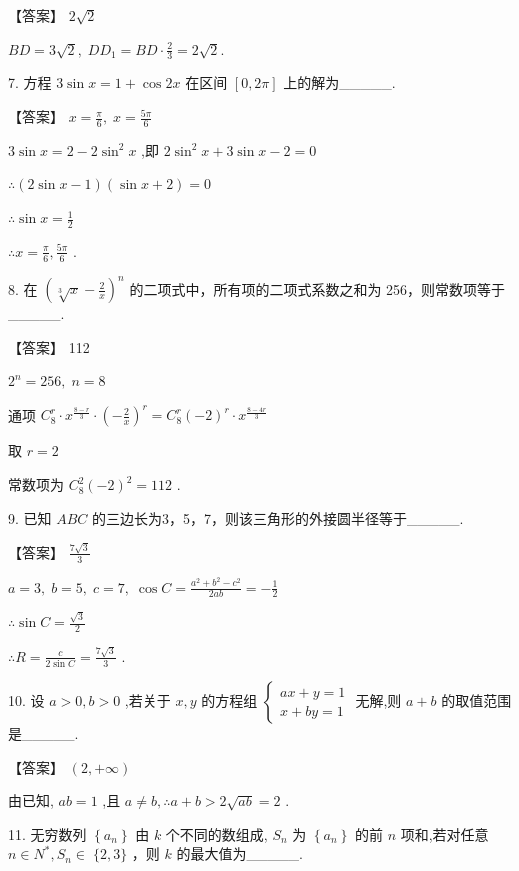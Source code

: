 \documentclass[10pt]{article}
\begin{document}
【答案】 \(2\sqrt{2}\)

\({BD} = 3\sqrt{2},\;D{D}_{1} = {BD} \cdot  \frac{2}{3} = 2\sqrt{2}.\)

7. 方程 \(3\sin x = 1 + \cos {2x}\) 在区间 \(\left\lbrack  {0,{2\pi }}\right\rbrack\) 上的解为\_\_\_\_\_.

【答案】 \(x = \frac{\pi }{6},\;x = \frac{5\pi }{6}\)

\(3\sin x = 2 - 2{\sin }^{2}x\) ,即 \(2{\sin }^{2}x + 3\sin x - 2 = 0\)

\(\therefore \left( {2\sin x - 1}\right) \left( {\sin x + 2}\right)  = 0\)

\(\therefore \sin x = \frac{1}{2}\)

\(\therefore x = \frac{\pi }{6},\frac{5\pi }{6}\) .

8. 在 \({\left( \sqrt[3]{x} - \frac{2}{x}\right) }^{n}\) 的二项式中，所有项的二项式系数之和为 256，则常数项等于\_\_\_\_\_.

【答案】 112

\({2}^{n} = {256},\;n = 8\)

通项 \({C}_{8}^{r} \cdot  {x}^{\frac{8 - r}{3}} \cdot  {\left( -\frac{2}{x}\right) }^{r} = {C}_{8}^{r}{\left( -2\right) }^{r} \cdot  {x}^{\frac{8 - {4r}}{3}}\)

取 \(r = 2\)

常数项为 \({C}_{8}^{2}{\left( -2\right) }^{2} = {112}\) .

9. 已知 \({ABC}\) 的三边长为3，5，7，则该三角形的外接圆半径等于\_\_\_\_\_.

【答案】 \(\frac{7\sqrt{3}}{3}\)

\(a = 3,\;b = 5,\;c = 7,\;\cos C = \frac{{a}^{2} + {b}^{2} - {c}^{2}}{2ab} =  - \frac{1}{2}\)

\(\therefore \sin C = \frac{\sqrt{3}}{2}\)

\(\therefore R = \frac{c}{2\sin C} = \frac{7\sqrt{3}}{3}\) .

10. 设 \(a > 0,b > 0\) ,若关于 \(x,y\) 的方程组 \(\left\{  \begin{array}{l} {ax} + y = 1 \\  x + {by} = 1 \end{array}\right.\) 无解,则 \(a + b\) 的取值范围是\_\_\_\_\_.

【答案】 \(\left( {2, + \infty }\right)\)

由已知, \({ab} = 1\) ,且 \(a \neq  b,\therefore a + b > 2\sqrt{ab} = 2\) .

11. 无穷数列 \(\left\{  {a}_{n}\right\}\) 由 \(k\) 个不同的数组成, \({S}_{n}\) 为 \(\left\{  {a}_{n}\right\}\) 的前 \(n\) 项和,若对任意 \(n \in  {N}^{ * },{S}_{n} \in \; \{ 2,3\}\) ，则 \(k\) 的最大值为\_\_\_\_\_.
\end{document}
